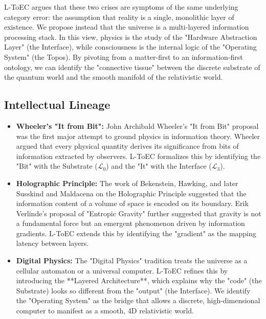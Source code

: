 \documentclass[11pt,titlepage]{article}
\newcommand{\substrate}{\mathcal{L}_0}
\newcommand{\interface}{\mathcal{L}_3}
\begin{document}
L-ToEC argues that these two crises are symptoms of the same underlying category error: the assumption that reality is a single, monolithic layer of existence. We propose instead that the universe is a multi-layered information processing stack. In this view, physics is the study of the "Hardware Abstraction Layer" (the Interface), while consciousness is the internal logic of the "Operating System" (the Topos). By pivoting from a matter-first to an information-first ontology, we can identify the "connective tissue" between the discrete substrate of the quantum world and the smooth manifold of the relativistic world.

\subsection{Intellectual Lineage}
\begin{itemize}
    
\item \textbf{Wheeler's "It from Bit":} John Archibald Wheeler's "It from Bit" proposal was the first major attempt to ground physics in information theory. Wheeler argued that every physical quantity derives its significance from bits of information extracted by observers. L-ToEC formalizes this by identifying the "Bit" with the Substrate ($\substrate$) and the "It" with the Interface ($\interface$).
    
\item \textbf{Holographic Principle:} The work of Bekenstein, Hawking, and later Susskind and Maldacena on the Holographic Principle suggested that the information content of a volume of space is encoded on its boundary. Erik Verlinde's proposal of "Entropic Gravity" further suggested that gravity is not a fundamental force but an emergent phenomenon driven by information gradients. L-ToEC extends this by identifying the "gradient" as the mapping latency between layers.
    
\item \textbf{Digital Physics:} The "Digital Physics" tradition treats the universe as a cellular automaton or a universal computer. L-ToEC refines this by introducing the **Layered Architecture**, which explains why the "code" (the Substrate) looks so different from the "output" (the Interface). We identify the "Operating System" as the bridge that allows a discrete, high-dimensional computer to manifest as a smooth, 4D relativistic world.
\end{itemize}
\end{document}
